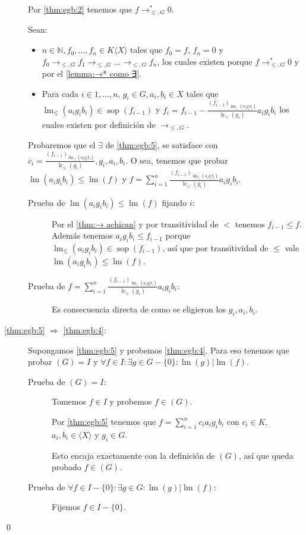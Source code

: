 \documentclass[12pt]{report}
\theoremstyle{customstyle}
\renewenvironment{proof}[1][\proofname]{{\noindent \bfseries #1: }}{\qed} %
\theoremstyle{factstyle}
\DeclareMathOperator{\sop}{sop}
\DeclareMathOperator{\lm}{lm}
\DeclareMathOperator{\lc}{lc}
\begin{document}
\begin{proof}
\begin{description}
    Por \ref{thm:egb:2} tenemos que $f →^*_{≤, G} 0$.

    Sean:
    \begin{itemize}
      \item $n ∈ ℕ, f_0, …, f_n ∈ K⟨X⟩$ tales que $f_0 = f$, $f_n = 0$ y $f_0 →_{≤, G} f_1 →_{≤, G} … →_{≤, G} f_n$, los cuales existen porque $f →^*_{≤, G} 0$ y por el \cref{lemma:→* como ∃}.
      \item Para cada $i ∈ {1, …, n}$, $g_i ∈ G, a_i, b_i ∈ X$ tales que $\lm_≤(a_i g_i b_i) ∈ \sop(f_{i-1})$ y $f_i = f_{i-1} - \frac{(f_{i-1})_{\lm_≤(a_i g_i b_i)}}{\lc_≤(g_i)}a_i g_i b_i$ los cuales existen por definición de $→_{≤, G}$.
    \end{itemize}

    Probaremos que el $∃$ de \ref{thm:egb:5}, se satisface con $c_i = \frac{(f_{i-1})_{\lm_≤(a_i g_i b_i)}}{\lc_≤(g_i)}, g_i, a_i, b_i$. O sea, tenemos que probar $\lm(a_i g_i b_i) ≤ \lm(f)$ y $f = ∑_{i = 1}^n \frac{(f_{i-1})_{\lm_≤(a_i g_i b_i)}}{\lc_≤(g_i)} a_i g_i b_i$.

    \begin{description}
      \item[Prueba de $\lm(a_i g_i b_i) ≤ \lm(f)$ fijando $i$:] Por el \cref{thm:→ achican} y por transitividad de $<$ tenemos $f_{i-1} ≤ f$. Además tenemos $a_i g_i b_i ≤ f_{i-1}$ porque $\lm_≤(a_i g_i b_i) ∈ \sop(f_{i-1})$, así que por transitividad de $≤$ vale $\lm(a_i g_i b_i) ≤ \lm(f)$.
      \item[Prueba de $f = ∑_{i = 1}^n \frac{(f_{i-1})_{\lm_≤(a_i g_i b_i)}}{\lc_≤(g_i)} a_i g_i b_i$:] Es consecuencia directa de como se eligieron los $g_i, a_i, b_i$.
    \end{description}

    \item[\ref{thm:egb:5} $⇒$ \ref{thm:egb:4}:] Supongamos \ref{thm:egb:5} y probemos \ref{thm:egb:4}. Para eso tenemos que probar $(G) = I$ y $∀f ∈ I : ∃g ∈ G - \{0\} : \lm(g) | \lm(f)$.

    \begin{description}
      \item[Prueba de $(G) = I$:] Tomemos $f ∈ I$ y probemos $f ∈ (G)$.

      Por \ref{thm:egb:5} tenemos que $f = ∑_{i = 1}^n c_i a_i g_i b_i$ con $c_i ∈ K$, $a_i, b_i ∈ ⟨X⟩$ y $g_i ∈ G$.

      Esto encaja exactamente con la definición de $(G)$, así que queda probado $f ∈ (G)$.

      \item[Prueba de $∀f ∈ I - \{0\} : ∃g ∈ G : \lm(g) | \lm(f)$:] Fijemos $f ∈ I - \{0\}$.


\end{description}
\end{description}
\end{proof}
\end{document}
